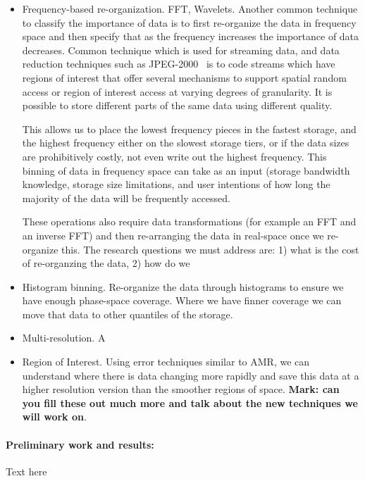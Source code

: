 \begin{itemize}
\item Frequency-based re-organization. FFT, Wavelets.
Another common technique to classify the importance of data is to first re-organize the data
in frequency space and then specify that as the frequency increases the importance of data
decreases.   Common technique which is used for streaming data, and data reduction techniques such as JPEG-2000~\cite{jpeg2000}
is to  code streams which have regions of interest that offer several mechanisms to support spatial random access or region of interest access at varying degrees of granularity. It is possible to store different parts of the same data using different quality.

This allows us to place the lowest frequency pieces in the fastest storage, and
the highest frequency either on the slowest storage tiers, or if the data sizes are prohibitively  
costly, not even write out the highest frequency. This binning of data in frequency space can
take as an input (storage bandwidth knowledge, storage size limitations, and user intentions
of how long the majority of the data will be frequently accessed. 

These operations also require data transformations (for example an FFT and an inverse FFT)
and then re-arranging the data in real-space once we re-organize this. The research questions
we must address are: 1) what is the cost of re-organzing the data, 2) how do we 

\item Histogram binning. Re-organize the data through histograms to ensure we have enough
phase-space coverage. Where we have finner coverage we can move that data to other
quantiles of the storage. 

\item Multi-resolution.  
A


\item Region of Interest. Using error techniques similar to AMR, we can understand where there
is data changing more rapidly and save this data at a higher resolution version than the smoother
regions of space.
{\bf Mark: can you fill these out much more and talk about the new techniques we will work on}.
\end{itemize}
\paragraph{Preliminary work and results:}
Text here
